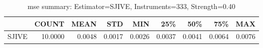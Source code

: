 \begin{table}[ht]
\centering
\caption{mse summary: Estimator=SJIVE, Instruments=333, Strength=0.40}
\begin{tabular}{lrrrrrrrr}
\toprule
 & COUNT & MEAN & STD & MIN & 25\% & 50\% & 75\% & MAX \\
\midrule
SJIVE & 10.0000 & 0.0048 & 0.0017 & 0.0026 & 0.0037 & 0.0041 & 0.0064 & 0.0076 \\
\bottomrule
\end{tabular}
\end{table}

